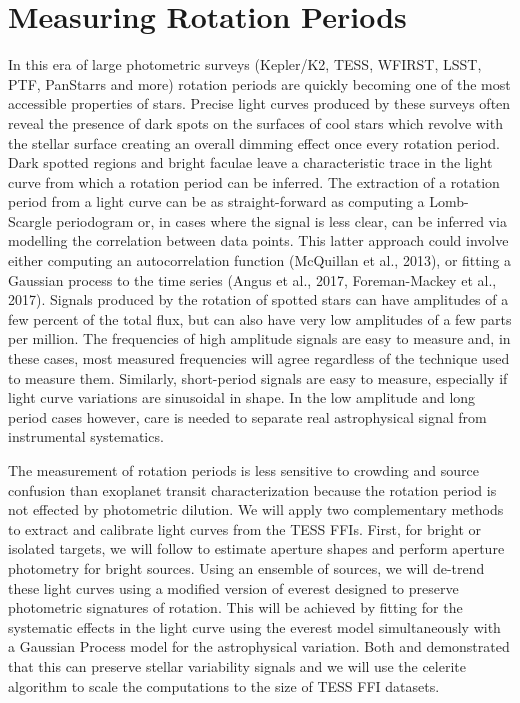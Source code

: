 \documentclass[useAMS, usenatbib, preprint, 12pt]{aastex}
\begin{document}
\section{Measuring Rotation Periods}
In this era of large photometric surveys (Kepler/K2, TESS, WFIRST, LSST, PTF,
PanStarrs and more) rotation periods are quickly becoming one of the most
accessible properties of stars.
Precise light curves produced by these surveys often reveal the presence of
dark spots on the surfaces of cool stars which revolve with the stellar
surface creating an overall dimming effect once every rotation period.
Dark spotted regions and bright faculae leave a characteristic trace in the
light curve from which a rotation period can be inferred.
The extraction of a rotation period from a light curve can be as
straight-forward as computing a Lomb-Scargle periodogram or, in cases where
the signal is less clear, can be inferred via modelling the correlation
between data points.
This latter approach could involve either computing an autocorrelation
function (McQuillan et al., 2013), or fitting a Gaussian process to the time
series (Angus et al., 2017, Foreman-Mackey et al., 2017).
Signals produced by the rotation of spotted stars can have amplitudes of a few
percent of the total flux, but can also have very low amplitudes of a few
parts per million.
The frequencies of high amplitude signals are easy to measure and, in these
cases, most measured frequencies will agree regardless of the technique used
to measure them.
Similarly, short-period signals are easy to measure, especially if light curve
variations are sinusoidal in shape.
In the low amplitude and long period cases however, care is needed to separate
real astrophysical signal from instrumental systematics.

The measurement of rotation periods is less sensitive to crowding and source
confusion than exoplanet transit characterization because the rotation period
is not effected by photometric dilution.
We will apply two complementary methods to extract and calibrate light curves
from the TESS FFIs.
First, for bright or isolated targets, we will follow \citet{montet2017} to
estimate aperture shapes and perform aperture photometry for bright sources.
Using an ensemble of sources, we will de-trend these light curves using a
modified version of \textsf{everest} \citep{luger2016, luger2017} designed to
preserve photometric signatures of rotation.
This will be achieved by fitting for the systematic effects in the light curve
using the \textsf{everest} model simultaneously with a Gaussian Process model
for the astrophysical variation.
Both \citet{aigrain2016b} and \citet{luger2016} demonstrated that this can
preserve stellar variability signals and we will use the \textsf{celerite}
algorithm \citep{dfm2017} to scale the computations to the size of TESS FFI
datasets.
\end{document}
